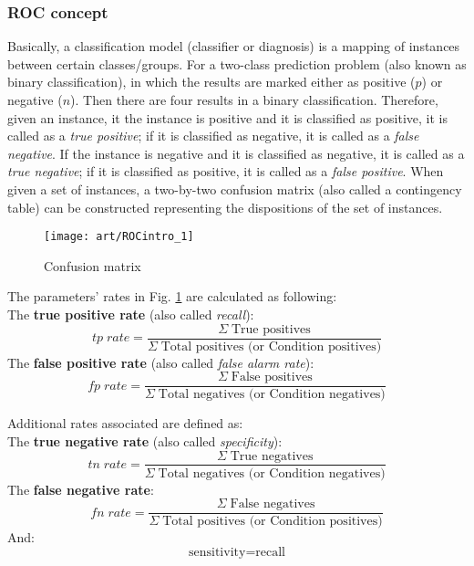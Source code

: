 \subsubsection{ROC concept}
Basically, a classification model (classifier or diagnosis) is a mapping of instances between certain classes/groups. For a two-class prediction problem (also known as binary classification), in which the results are marked either as positive ($p$) or negative ($n$). Then there are four results in a binary classification. Therefore, given an instance, it the instance is positive and it is classified as positive, it is called as a \textit{true positive}; if it is classified as negative, it is called as a \textit{false negative}. If the instance is negative and it is classified as negative, it is called as a \textit{true negative}; if it is classified as positive, it is called as a \textit{false positive}. When given a set of instances, a two-by-two confusion matrix (also called a contingency table) can be constructed representing the dispositions of the set of instances. 
\begin{figure}[ht]
	\centering
	\texttt{[image: art/ROCintro\_1]}
	\caption{Confusion matrix}
	\label{ROCintro_1}
\end{figure}

The parameters' rates in Fig. \ref{ROCintro_1} are calculated as following:\\
The \textbf{true positive rate} (also called \textit{recall}):
\begin{equation}
tp\; rate = \frac{\Sigma \; \text{True positives}}{\Sigma \; \text{Total positives (or Condition positives)}}
\end{equation}
The \textbf{false positive rate} (also called \textit{false alarm rate}):
\begin{equation}
fp\; rate = \frac{\Sigma \; \text{False positives}}{\Sigma \; \text{Total negatives (or Condition negatives)}}
\end{equation}

Additional rates associated are defined as:\\
The \textbf{true negative rate} (also called \textit{specificity}): 
\begin{equation}
tn\; rate = \frac{\Sigma \; \text{True negatives}}{\Sigma \; \text{Total negatives (or Condition negatives)}}
\end{equation}
The \textbf{false negative rate}:
\begin{equation}
fn\; rate = \frac{\Sigma \; \text{False negatives}}{\Sigma \; \text{Total positives (or Condition positives)}}
\end{equation}
And:
\begin{equation*}
\text{sensitivity} = \text{recall}
\end{equation*}

